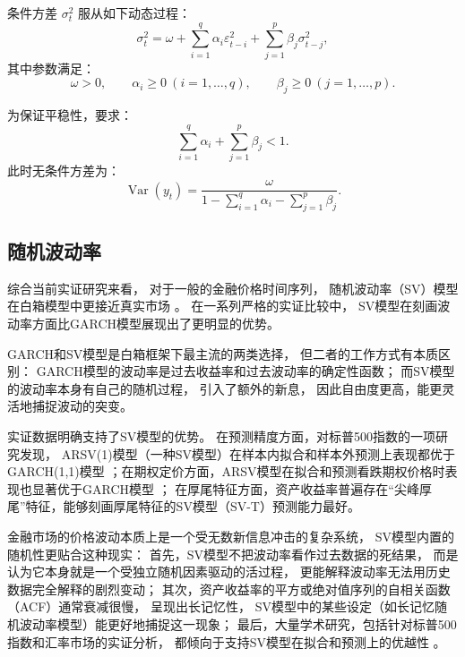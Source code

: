 \documentclass[a4paper,10pt]{article}
\begin{document}
条件方差 $\sigma_t^2$ 服从如下动态过程：
\begin{equation}
    \sigma_t^2 = \omega + \sum_{i=1}^{q} \alpha_i \varepsilon_{t-i}^2 + \sum_{j=1}^{p} \beta_j \sigma_{t-j}^2, \label{eq:garch_variance}
\end{equation}
其中参数满足：
\begin{equation}
    \omega > 0, \qquad \alpha_i \ge 0 \ (i=1,\dots,q), \qquad \beta_j \ge 0 \ (j=1,\dots,p).
\end{equation}

为保证平稳性，要求：
\begin{equation}
    \sum_{i=1}^{q} \alpha_i + \sum_{j=1}^{p} \beta_j < 1.
\end{equation}
此时无条件方差为：
\begin{equation}
    \operatorname{Var}(y_t) = \frac{\omega}{1 - \sum_{i=1}^{q} \alpha_i - \sum_{j=1}^{p} \beta_j}.
\end{equation}

\subsection{随机波动率}

综合当前实证研究来看，
对于一般的金融价格时间序列，
随机波动率（SV）模型在白箱模型中更接近真实市场 
\cite{PangZhao2025GARCHSV}。
在一系列严格的实证比较中，
SV模型在刻画波动率方面比GARCH模型展现出了更明显的优势。

GARCH和SV模型是白箱框架下最主流的两类选择，
但二者的工作方式有本质区别：
GARCH模型的波动率是过去收益率和过去波动率的确定性函数；
而SV模型的波动率本身有自己的随机过程，
引入了额外的新息，
因此自由度更高，能更灵活地捕捉波动的突变。

实证数据明确支持了SV模型的优势。
在预测精度方面，对标普500指数的一项研究发现，
ARSV(1)模型（一种SV模型）在样本内拟合和样本外预测上表现都优于GARCH(1,1)模型 \cite{PangZhao2025GARCHSV}；在期权定价方面，ARSV模型在拟合和预测看跌期权价格时表现也显著优于GARCH模型 \cite{PangZhao2025GARCHSV}；
在厚尾特征方面，资产收益率普遍存在“尖峰厚尾”特征，能够刻画厚尾特征的SV模型（SV-T）预测能力最好。

金融市场的价格波动本质上是一个受无数新信息冲击的复杂系统，
SV模型内置的随机性更贴合这种现实：
首先，SV模型不把波动率看作过去数据的死结果，
而是认为它本身就是一个受独立随机因素驱动的活过程，
更能解释波动率无法用历史数据完全解释的剧烈变动；
其次，资产收益率的平方或绝对值序列的自相关函数（ACF）通常衰减很慢，
呈现出长记忆性，
SV模型中的某些设定（如长记忆随机波动率模型）能更好地捕捉这一现象；
最后，大量学术研究，包括针对标普500指数和汇率市场的实证分析，
都倾向于支持SV模型在拟合和预测上的优越性 
\cite{PangZhao2025GARCHSV}。
\end{document}
